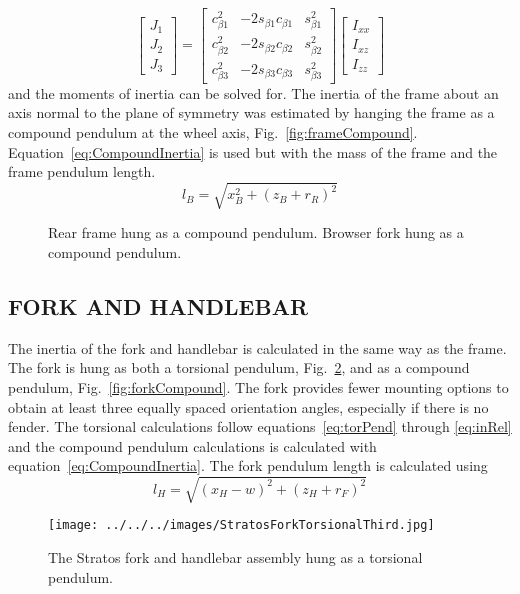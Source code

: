 \documentclass{bmd2010p}
\begin{document}
\begin{equation}
	\left[
	\begin{array}{c}
		J_{1}\\
		J_{2}\\
		J_{3}
	\end{array}
	\right]
	=
	\left[
	\begin{array}{ccc}
		c_{\beta 1}^2 & -2s_{\beta 1}c_{\beta 1} & s_{\beta 1}^2\\
		c_{\beta 2}^2 & -2s_{\beta 2}c_{\beta 2} & s_{\beta 2}^2\\
		c_{\beta 3}^2 & -2s_{\beta 3}c_{\beta 3} & s_{\beta 3}^2
	\end{array}
	\right]
	\left[
	\begin{array}{c}
		I_{xx}\\
		I_{xz}\\
		I_{zz}
	\end{array}
	\right]
\label{eq:inRel}
\end{equation}
and the moments of inertia can be solved for.
The inertia of the frame about an axis normal to the plane of symmetry was
estimated by hanging the frame as a compound pendulum at the wheel axis,
Fig.~\ref{fig:frameCompound}. Equation~\ref{eq:CompoundInertia} is used but
with the mass of the frame and the frame pendulum length.
\begin{equation}
    l_B=\sqrt{x_B^2+(z_B+r_R)^2}
    \label{eq:FramePendLength}
\end{equation}
\begin{figure}[tb]
    \centering
        \caption{ Rear frame hung as a compound
        pendulum.  Browser fork hung as a
        compound pendulum.}
        \label{fig:compound}
\end{figure}
\subsection{FORK AND HANDLEBAR}
The inertia of the fork and handlebar is calculated in the same way as the frame. The fork is
hung as both a torsional pendulum, Fig.~\ref{fig:StratosFork}, and as a compound pendulum,
Fig.~\ref{fig:forkCompound}. The fork provides fewer mounting options to
obtain at least three equally spaced orientation angles, especially if there is
no fender. The torsional calculations follow equations~\ref{eq:torPend} through
\ref{eq:inRel} and the compound pendulum calculations is calculated with
equation~\ref{eq:CompoundInertia}. The fork pendulum length is calculated using
\begin{equation}
    l_H=\sqrt{(x_H-w)^2+(z_H+r_F)^2}
\end{equation}
\begin{figure}[tb]
    \centering
    \texttt{[image: ../../../images/StratosForkTorsionalThird.jpg]}
    \caption{The Stratos fork and handlebar assembly hung as a torsional
        pendulum.}
    \label{fig:StratosFork}
\end{figure}
\end{document}
